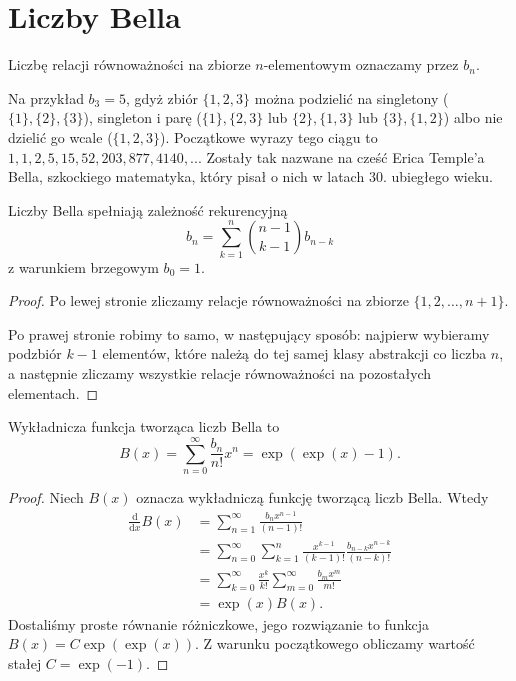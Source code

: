 \section{Liczby Bella}

\begin{definition}
	Liczbę relacji równoważności na zbiorze $n$-elementowym oznaczamy przez $b_n$.
\end{definition}

Na przykład $b_3 = 5$, gdyż zbiór $\{1, 2, 3\}$ można podzielić na singletony ($\{1\}, \{2\}, \{3\}$), singleton i parę ($\{1\}, \{2, 3\}$ lub $\{2\}, \{1, 3\}$ lub $\{3\}, \{1, 2\}$) albo nie dzielić go wcale ($\{1, 2, 3\}$).
Początkowe wyrazy tego ciągu to $1, 1, 2, 5, 15, 52, 203, 877, 4140, ...$
Zostały tak nazwane na cześć Erica Temple'a Bella, szkockiego matematyka, który pisał o nich w latach 30. ubiegłego wieku.
%

\begin{proposition}
	Liczby Bella spełniają zależność rekurencyjną
	\begin{equation}
		b_n = \sum_{k=1}^n {n-1 \choose k-1} b_{n-k}
	\end{equation}
	z warunkiem brzegowym $b_0 = 1$.
\end{proposition}

\begin{proof}
	Po lewej stronie zliczamy relacje równoważności na zbiorze $\{1, 2, \ldots, n+1\}$.

	Po prawej stronie robimy to samo, w następujący sposób: najpierw wybieramy podzbiór $k-1$ elementów, które należą do tej samej klasy abstrakcji co liczba $n$, a następnie zliczamy wszystkie relacje równoważności na pozostałych elementach.
\end{proof}

\begin{proposition}
	Wykładnicza funkcja tworząca liczb Bella to
	\begin{equation}
		B(x) = \sum_{n=0}^\infty \frac{b_n}{n!} x^n  = \exp(\exp(x) - 1).
	\end{equation}
\end{proposition}


\begin{proof}
	Niech $B(x)$ oznacza wykładniczą funkcję tworzącą liczb Bella.
	Wtedy
	\begin{align}
		\frac{\mathrm{d}}{\mathrm{d}x} B(x) & = \sum_{n=1}^\infty \frac{b_n x^{n-1}}{(n-1)!} \\
		& = \sum_{n=0}^\infty \sum_{k=1}^n \frac{x^{k-1}}{(k-1)!} \frac{b_{n-k} x^{n-k}}{(n-k)!} \\
		& = \sum_{k=0}^\infty \frac{x^k}{k!} \sum_{m=0}^\infty \frac{b_m x^m}{m!} \\
		& = \exp(x) B(x).
	\end{align}
	Dostaliśmy proste równanie różniczkowe, jego rozwiązanie to funkcja $B(x) = C \exp(\exp(x))$.
	Z warunku początkowego obliczamy wartość stałej $C = \exp(-1)$.
\end{proof}


